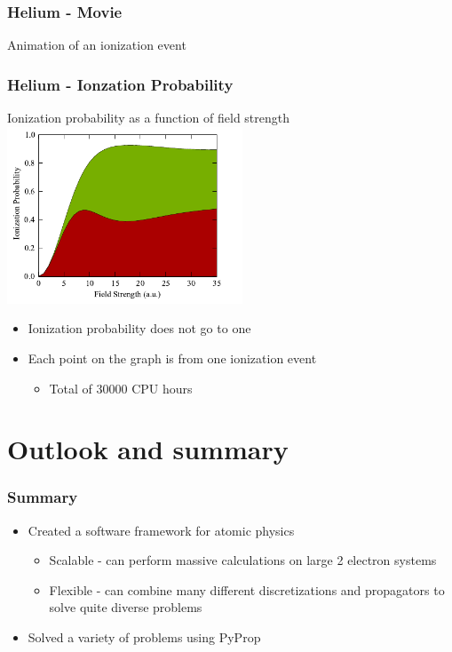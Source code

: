 \documentclass{beamer}
\begin{document}
\begin{frame}
	\frametitle{Helium - Movie}

	\begin{center}
		Animation of an ionization event
	\end{center}
\end{frame}


\begin{frame}
	\frametitle{Helium - Ionzation Probability}

	\begin{center}
		Ionization probability as a function of field strength
		\includegraphics[width=7cm]{figurer/1s1s_ionization_probability.pdf}
	\end{center}
	\vspace{-0.8cm}
	\begin{itemize}
		\item Ionization probability does not go to one
		\item Each point on the graph is from one ionization event
			\begin{itemize}
				\item Total of 30000 CPU hours
			\end{itemize}
	\end{itemize}
\end{frame}


\section{Outlook and summary}

\begin{frame}
	\frametitle{Summary}

	\begin{itemize}
		\item<1-> Created a software framework for atomic physics
			\begin{itemize}
				\item<2-> Scalable - can perform massive calculations on large 2 electron systems
				\item<3-> Flexible - can combine many different discretizations and propagators to solve quite diverse problems
			\end{itemize}
		
		\item<4-> Solved a variety of problems using PyProp
	\end{itemize}
\end{frame}
\end{document}
